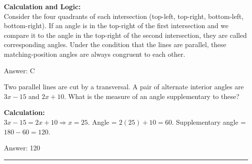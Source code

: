 \documentclass[11pt,paper=a4,answers]{exam}
\begin{document}
\begin{questions}
\begin{solution}
\textbf{Calculation and Logic:} \\
Consider the four quadrants of each intersection (top-left, top-right, bottom-left, bottom-right). If an angle is in the top-right of the first intersection and we compare it to the angle in the top-right of the second intersection, they are called corresponding angles. Under the condition that the lines are parallel, these matching-position angles are always congruent to each other.

\vspace{30pt}

Answer: \colorbox{yellow!100}{C}
\end{solution}

\question
Two parallel lines are cut by a transversal. A pair of alternate interior angles are $3x - 15$ and $2x + 10$. What is the measure of an angle supplementary to these?

\begin{solution}
\textbf{Calculation:} \\
$3x - 15 = 2x + 10 \Rightarrow x = 25$.
Angle = $2(25) + 10 = 60$.
Supplementary angle = $180 - 60 = 120$.

\vspace{30pt}

Answer: \colorbox{yellow!100}{120}
\end{solution}

\end{questions}
\begin{center}
\rule{.5\textwidth}{1pt}
\end{center}
\end{document}
